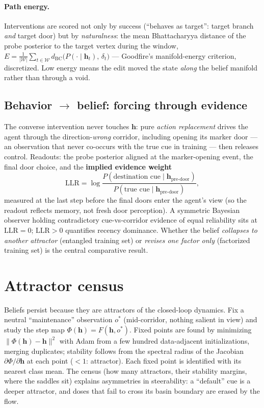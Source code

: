 \documentclass[11pt]{article}
\newcommand{\h}{\bm{h}}
\newcommand{\dBC}{d_{\mathrm{BC}}}
\begin{document}
\paragraph{Path energy.} Interventions are scored not only by success
(``behaves as target'': target branch \emph{and} target door) but by
\emph{naturalness}: the mean Bhattacharyya distance of the probe posterior to
the target vertex during the window,
$E = \tfrac1{|\mathcal W|}\sum_{t\in\mathcal W}
\dBC\!\big(P(\cdot\mid\h_t),\, \delta_{t}\big)$ ---
Goodfire's manifold-energy criterion, discretized. Low energy means the edit
moved the state \emph{along} the belief manifold rather than through a void.

\subsection{Behavior $\to$ belief: forcing through evidence}

The converse intervention never touches $\h$: pure \emph{action replacement}
drives the agent through the direction-\emph{wrong} corridor, including opening
its marker door --- an observation that never co-occurs with the true cue in
training --- then releases control. Readouts: the probe posterior aligned at
the marker-opening event, the final door choice, and the \textbf{implied
evidence weight}
\begin{equation}
  \mathrm{LLR} = \log \frac{P(\text{destination cue}\mid \h_{\text{pre-door}})}
                           {P(\text{true cue}\mid \h_{\text{pre-door}})},
\end{equation}
measured at the last step before the final doors enter the agent's view (so
the readout reflects memory, not fresh door perception). A symmetric Bayesian
observer holding contradictory cue-vs-corridor evidence of equal reliability
sits at $\mathrm{LLR}=0$; $\mathrm{LLR}>0$ quantifies recency dominance.
Whether the belief \emph{collapses to another attractor} (entangled training
set) or \emph{revises one factor only} (factorized training set) is the
central comparative result.

\section{Attractor census}

Beliefs persist because they are attractors of the closed-loop dynamics. Fix a
neutral ``maintenance'' observation $o^\ast$ (mid-corridor, nothing salient in
view) and study the step map $\Phi(\h) = F(\h, o^\ast)$. Fixed points are found
by minimizing $\lVert \Phi(\h) - \h\rVert^2$ with Adam from a few hundred
data-adjacent initializations, merging duplicates; stability follows from the
spectral radius of the Jacobian $\partial\Phi/\partial\h$ at each point
($<\!1$: attractor). Each fixed point is identified with its nearest class
mean. The census (how many attractors, their stability margins, where the
saddles sit) explains asymmetries in steerability: a ``default'' cue is a
deeper attractor, and doses that fail to cross its basin boundary are erased
by the flow.
\end{document}
